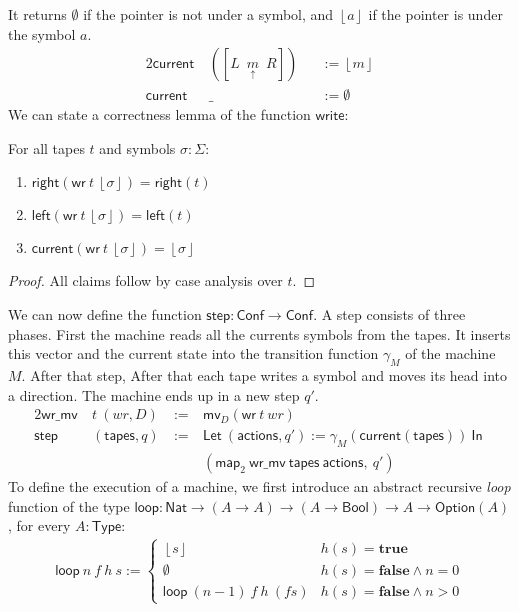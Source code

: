 \documentclass{psartcl}
\newcommand{\MS}[1]{\textsf{#1}}
\newcommand{\from}{:}
\renewcommand{\to}{\rightarrow}
\newcommand{\Option}{\MS{Option}}
\newcommand{\Bool}{\MS{Bool}}
\newcommand{\Nat}{\MS{Nat}}
\newcommand{\Type}{\MS{Type}}
\newcommand{\Some}[1]{\left\lfloor #1\right\rfloor}
\renewcommand{\None}{\emptyset}
\newcommand{\true}{\mathbf{true}}
\newcommand{\false}{\mathbf{false}}
\newcommand{\tape}[1]{[ #1 ]}
\newcommand{\tapePointer}[1]{\; \underset{\uparrow}{#1} \;}
\newcommand{\midtape}[3]{\tape{#1 ~ \tapePointer{#2} ~ #3}}
\newcommand{\mlet}[2]{\MS{Let}~#1~\MS{In}~#2}
\newcommand{\map}{\ensuremath{\MS{map}}}
\begin{document}
It returns $\None$ if the pointer is not under a symbol, and $\Some a$ if the pointer is under the symbol $a$.
\begin{alignat*}{2}
  \MS{current}&~(\midtape{L}{m}{R})&&:= \Some m \\
  \MS{current}&~\_                 &&:= \None
\end{alignat*}
We can state a correctness lemma of the function $\MS{write}$:
\begin{lemma}[Write]
  \label{lem:write}
  For all tapes $t$ and symbols $\sigma:\Sigma$:
  \begin{enumerate}
    \item $\MS{right}   (\MS{wr}~t~\Some\sigma) = \MS{right}(t)$
    \item $\MS{left}    (\MS{wr}~t~\Some\sigma) = \MS{left} (t)$
    \item $\MS{current} (\MS{wr}~t~\Some\sigma) = \Some\sigma$
  \end{enumerate}
\end{lemma}
\begin{proof}
  All claims follow by case analysis over $t$.
\end{proof}
We can now define the function $\MS{step} \from \MS{Conf} \to \MS{Conf}$.  A step consists of three phases.  First the machine reads all the currents
symbols from the tapes.  It inserts this vector and the current state into the transition function $\gamma_M$ of the machine $M$.  After that step,
After that each tape writes a symbol and moves its head into a direction.  The machine ends up in a new step $q'$.
\begin{alignat*}{2}
  \MS{wr\_mv}&~t~(wr, D)     &~:=~& \MS{mv}_D (\MS{wr}~t~wr) \\
  \MS{step}&~(\MS{tapes}, q) &~:=~& \mlet{(\MS{actions}, q') := \gamma_M(\MS{current}(\MS{tapes}))}{ \\
           &                  &~  ~& (\map_2~\MS{wr\_mv}~\MS{tapes}~\MS{actions},~ q')}
\end{alignat*}
To define the execution of a machine, we first introduce an abstract recursive \emph{loop} function of the type
$\MS{loop} \from \Nat \to (A \to A) \to (A \to \Bool) \to A \to \Option(A)$, for every $A:\Type$:
\begin{align*}
  \MS{loop}~n~f~h~s :=
  \begin{cases}
    \Some{s}              & h(s) = \true \\
    \None                 & h(s) = \false \land n = 0 \\
    \MS{loop}~(n-1)~f~h~(f s)  & h(s) = \false \land n > 0
  \end{cases}
\end{align*}
\end{document}
